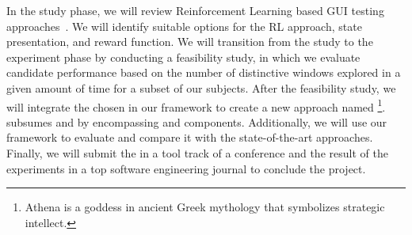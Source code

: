 \bigskip
\noindent
In the study phase, we will review Reinforcement Learning based  GUI testing approaches~\cite{Mariani:GUI:STVR:2014,Vuong:RLTest:A-Test:2018,Pan:QTesting:ISSTA:2020,Romdhana:ARES:TOSEM:2022}. 
We will identify suitable options for the RL approach, state presentation, and reward function.
We will transition from the study to the experiment phase by  conducting a feasibility study, in which we evaluate candidate \rlaganets performance based on the number of distinctive windows  explored in a given amount of time for a subset of our subjects. 
After the feasibility study, we will  integrate the chosen \rlaganet in our framework to create a new \testreuse approach named \rltool\footnote{Athena is a goddess in ancient Greek mythology that symbolizes strategic intellect.
}.
\rltool subsumes \visiontool and \llmtool by  encompassing \imagelabeler and \llmtranslator components.
Additionally, we will use our \tme framework to evaluate \rltool and compare it with the state-of-the-art \testreuse approaches.
Finally, we will submit the \rltool in a tool track of a conference and the result of the \testreuse experiments in a top software  engineering journal to conclude the project. 
















